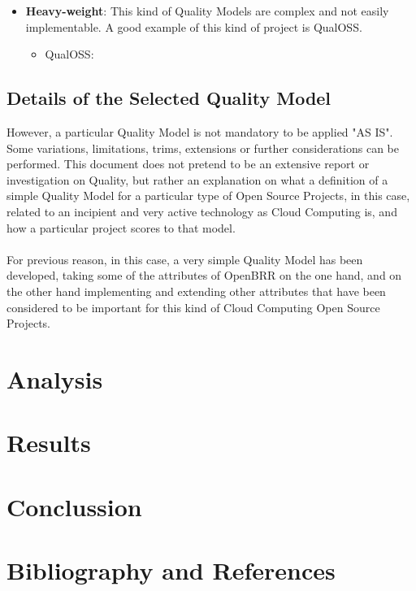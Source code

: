 \documentclass[11pt]{article}
\begin{document}
\begin{itemize}
\begin{itemize}
\end{itemize}
\item{\textbf{Heavy-weight}}: This kind of Quality Models are complex and not easily implementable. A good example of this kind of project is QualOSS.
\begin{itemize}\itemsep0pt
\item{QualOSS}:
\end{itemize}
\end{itemize}

\subsection{Details of the Selected Quality Model}
However, a particular Quality Model is not mandatory to be applied "AS IS". Some variations, limitations, trims, extensions or further considerations can be performed. This document does not pretend to be an extensive report or investigation on Quality, but rather an explanation on what a definition of a simple Quality Model for a particular type of Open Source Projects, in this case, related to an incipient and very active technology as Cloud Computing is, and how a particular project scores to that model.\\
\\
For previous reason, in this case, a very simple Quality Model has been developed, taking some of the attributes of OpenBRR on the one hand, and on the other hand implementing and extending other attributes that have been considered to be important for this kind of Cloud Computing Open Source Projects.

\section{Analysis} \label{sec:analysis}

\section{Results} \label{sec:results}

\section{Conclussion} \label{sec:conclussion}

\section{Bibliography and References} \label{sec:bibliography}

{}
\end{document}
